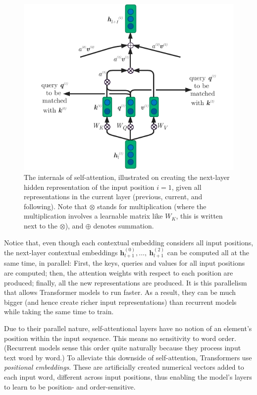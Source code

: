 \documentclass[bsc,frontabs,singlespacing,parskip,deptreport]{infthesis}
\begin{document}
{{{      \begin{figure}[h!t]
        \centering
        \includegraphics[width=12cm]{graphics/self-att}
        \cprotect\caption{The internals of self-attention, illustrated on creating the next-layer hidden representation of the input position $i=1$, given all representations in the current layer (previous, current, and following). Note that $\otimes$ stands for multiplication (where the multiplication involves a learnable matrix like $W_K$, this is written next to the $\otimes$), and $\oplus$ denotes summation.}
        \label{fig:self-att}
      \end{figure}

      Notice that, even though each contextual embedding considers all input positions, the next-layer contextual embeddings $\bm{h}_{l+1}^{(0)},\ldots,\ \bm{h}_{l+1}^{(2)}$ can be computed all at the same time, in parallel: First, the keys, queries and values for all input positions are computed; then, the attention weights with respect to each position are produced; finally, all the new representations are produced. It is this parallelism that allows Transformer models to run faster. As a result, they can be much bigger (and hence create richer input representations) than recurrent models while taking the same time to train.

      Due to their parallel nature, self-attentional layers have no notion of an element's position within the input sequence. This means no sensitivity to word order. (Recurrent models sense this order quite naturally because they process input text word by word.) To alleviate this downside of self-attention, Transformers use \textit{positional embeddings}. These are artificially created numerical vectors added to each input word, different across input positions, thus enabling the model's layers to learn to be position- and order-sensitive.

}}}
\end{document}
